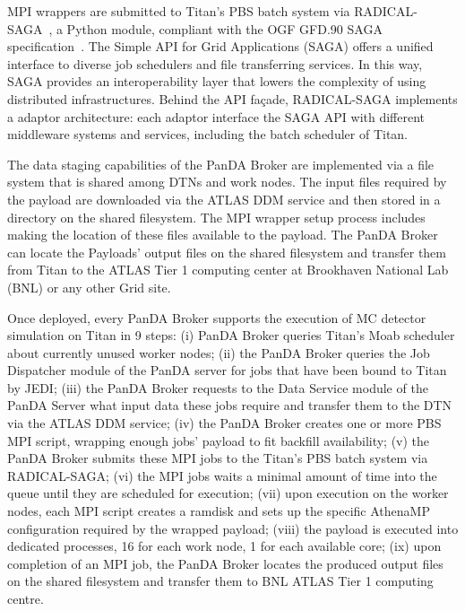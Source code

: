 MPI wrappers are submitted to Titan's PBS batch system via
RADICAL-SAGA~\cite{radical-saga}, a Python module, compliant with the OGF GFD.90
SAGA specification~\cite{saga-spec}. The Simple API for Grid Applications (SAGA)
offers a unified interface to diverse job schedulers and file transferring
services. In this way, SAGA provides an interoperability layer that lowers the
complexity of using distributed infrastructures. Behind the API façade,
RADICAL-SAGA implements a adaptor architecture: each adaptor interface the SAGA
API with different middleware systems and services, including the batch
scheduler of Titan.

The data staging capabilities of the PanDA Broker are implemented via a file
system that is shared among DTNs and work nodes. The input files required by the
payload are downloaded via the ATLAS DDM service and then stored in a directory
on the shared filesystem. The MPI wrapper setup process includes making the
location of these files available to the payload. The PanDA Broker can locate
the Payloads' output files on the shared filesystem and transfer them from Titan
to the ATLAS Tier 1 computing center at Brookhaven National Lab (BNL) or any
other Grid site.

Once deployed, every PanDA Broker supports the execution of MC
detector simulation on Titan in 9 steps: (i) PanDA Broker queries Titan's
Moab scheduler about currently unused worker nodes;
(ii) the PanDA Broker queries the Job Dispatcher module of the PanDA server for
jobs that have been bound to Titan by JEDI; (iii)  the PanDA Broker requests to
the Data Service module of the PanDA Server what input data these jobs require
and transfer them to the DTN via the ATLAS DDM service; (iv) the PanDA Broker
creates one or more PBS MPI script, wrapping enough jobs' payload to fit
backfill availability; (v) the PanDA Broker submits these MPI jobs to the
Titan's PBS batch system via RADICAL-SAGA; (vi) the MPI jobs waits a minimal
amount of time into the queue until they are scheduled for execution; (vii) upon
execution on the worker nodes, each MPI script creates a ramdisk and sets up the
specific AthenaMP configuration required by the wrapped payload; (viii) the
payload is executed into dedicated processes, 16 for each work node, 1 for each
available core; (ix) upon completion of an MPI job, the PanDA Broker locates the
produced output files on the shared filesystem and transfer them to BNL ATLAS
Tier 1 computing centre.


